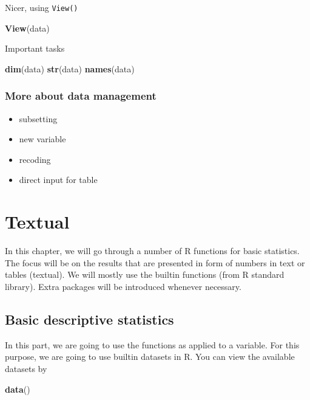 \documentclass[]{book}
\newenvironment{Shaded}{\begin{snugshade}}{\end{snugshade}}
\newcommand{\KeywordTok}[1]{\textcolor[rgb]{0.13,0.29,0.53}{\textbf{{#1}}}}
\newcommand{\NormalTok}[1]{{#1}}
\providecommand{\tightlist}{%
  \setlength{\itemsep}{0pt}\setlength{\parskip}{0pt}}
\theoremstyle{definition}
\theoremstyle{definition}
\theoremstyle{remark}
\begin{document}
Nicer, using \texttt{View()}

\begin{Shaded}
\begin{Highlighting}[]
\KeywordTok{View}\NormalTok{(data)}
\end{Highlighting}
\end{Shaded}

Important tasks

\begin{Shaded}
\begin{Highlighting}[]
\KeywordTok{dim}\NormalTok{(data)}
\KeywordTok{str}\NormalTok{(data)}
\KeywordTok{names}\NormalTok{(data)}
\end{Highlighting}
\end{Shaded}

\subsection{More about data
management}\label{more-about-data-management}

\begin{itemize}
\tightlist
\item
  subsetting
\item
  new variable
\item
  recoding
\item
  direct input for table
\end{itemize}

\chapter{Textual}\label{textual}

In this chapter, we will go through a number of R functions for basic
statistics. The focus will be on the results that are presented in form
of numbers in text or tables (textual). We will mostly use the builtin
functions (from R standard library). Extra packages will be introduced
whenever necessary.

\section{Basic descriptive
statistics}\label{basic-descriptive-statistics}

In this part, we are going to use the functions as applied to a
variable. For this purpose, we are going to use builtin datasets in R.
You can view the available datasets by

\begin{Shaded}
\begin{Highlighting}[]
\KeywordTok{data}\NormalTok{()}
\end{Highlighting}
\end{Shaded}
\end{document}

